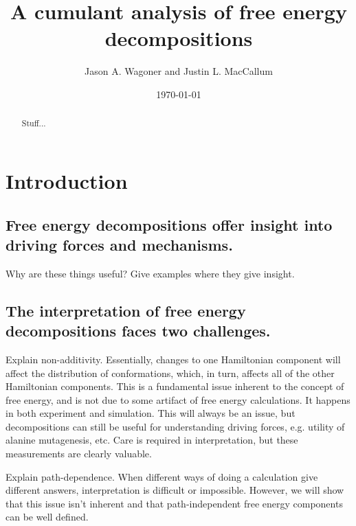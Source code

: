 \documentclass{article}
\begin{document}
\title{A cumulant analysis of free energy decompositions}
\author{Jason A. Wagoner and Justin L. MacCallum}

\date{ \today}

\maketitle

\begin{abstract}
Stuff...
\end{abstract}

\section{Introduction}

\subsection{Free energy decompositions offer insight into driving forces and mechanisms.}

Why are these things useful? Give examples where they give insight.







\subsection{The interpretation of free energy decompositions faces two challenges.}

Explain non-additivity. Essentially, changes to one Hamiltonian component will affect the distribution of conformations, which, in turn, affects all of the other Hamiltonian components. This is a fundamental issue inherent to the concept of free energy, and is not due to some artifact of free energy calculations. It happens in both experiment and simulation. This will always be an issue, but decompositions can still be useful for understanding driving forces, e.g. utility of alanine mutagenesis, etc. Care is required in interpretation, but these measurements are clearly valuable.

Explain path-dependence. When different ways of doing a calculation give different answers, interpretation is difficult or impossible. However, we will show that this issue isn't inherent and that path-independent free energy components can be well defined.
\end{document}
